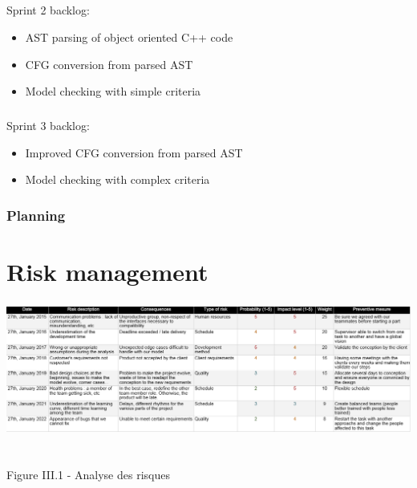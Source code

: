 \documentclass{report}
\begin{document}
\paragraph{}
\hspace{4mm}\textnormal{Sprint 2 backlog:}

\vspace{4mm}
\begin{itemize}
\item AST parsing of object oriented C++ code\vspace{1mm}
\item CFG conversion from parsed AST\vspace{1mm}
\item Model checking with simple criteria\vspace{1mm}
\end{itemize}

\paragraph{}
\hspace{4mm}\textnormal{Sprint 3 backlog:}

\vspace{4mm}
\begin{itemize}
\item Improved CFG conversion from parsed AST\vspace{1mm}
\item Model checking with complex criteria\vspace{1mm}
\end{itemize}

\subsection{Planning}


\chapter{Risk management}

\paragraph{}
\hspace{4mm}\textnormal{}

%
\begin{center}
\includegraphics[scale=0.5]{data/risks.png}
~\\~\\Figure III.1 - Analyse des risques
\end{center}
\end{document}
